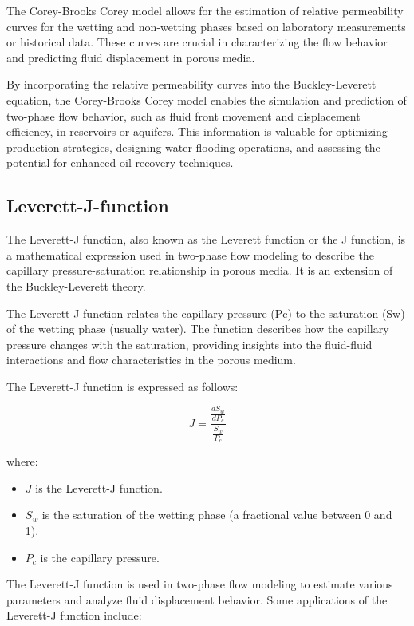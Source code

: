 \documentclass[letterpaper,12pt]{article}
\begin{document}
	
	The Corey-Brooks Corey model allows for the estimation of relative permeability curves for the wetting and non-wetting phases based on laboratory measurements or historical data. These curves are crucial in characterizing the flow behavior and predicting fluid displacement in porous media.
	\smallskip
	
	By incorporating the relative permeability curves into the Buckley-Leverett equation, the Corey-Brooks Corey model enables the simulation and prediction of two-phase flow behavior, such as fluid front movement and displacement efficiency, in reservoirs or aquifers. This information is valuable for optimizing production strategies, designing water flooding operations, and assessing the potential for enhanced oil recovery techniques.
	\subsection{ Leverett-J-function}
	The Leverett-J function, also known as the Leverett function or the J function, is a mathematical expression used in two-phase flow modeling to describe the capillary pressure-saturation relationship in porous media. It is an extension of the Buckley-Leverett theory. \smallskip
	
	The Leverett-J function relates the capillary pressure (Pc) to the saturation (Sw) of the wetting phase (usually water). The function describes how the capillary pressure changes with the saturation, providing insights into the fluid-fluid interactions and flow characteristics in the porous medium.
	\smallskip
	
	The Leverett-J function is expressed as follows:
	

	
	\[ J = \frac{{\frac{{dS_w}}{{dP_c}}}}{{\frac{{S_w}}{{P_c}}}} \]
	
	where:
	\begin{itemize}
		\item 	 \( J \) is the Leverett-J function.
		\item \( S_w \) is the saturation of the wetting phase (a fractional value between 0 and 1).
		\item \( P_c \) is the capillary pressure.
	\end{itemize}

	
	
	The Leverett-J function is used in two-phase flow modeling to estimate various parameters and analyze fluid displacement behavior. Some applications of the Leverett-J function include:
	
\end{document}
